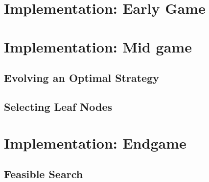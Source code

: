 \documentclass[twoside]{article}
\begin{document}
\begin{multicols}{2}

\section{Implementation: Early Game}


\section{Implementation: Mid game}

\subsection{Evolving an Optimal Strategy}

\subsection{Selecting Leaf Nodes}


\section{Implementation: Endgame}

\subsection{Feasible Search}



\begin{thebibliography}{99} %


\end{thebibliography}


\end{multicols}
\end{document}
